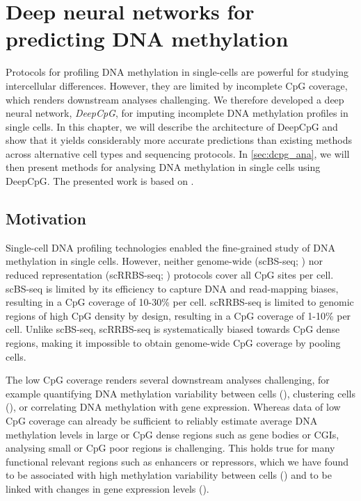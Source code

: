\chapter{Deep neural networks for predicting DNA methylation} \label{sec:dcpg}

\ifpdf
    \graphicspath{{Chapter4/Figs/Raster/}{Chapter4/Figs/PDF/}{Chapter4/Figs/}}
\else
    \graphicspath{{Chapter4/Figs/Vector/}{Chapter4/Figs/}}
\fi

Protocols for profiling DNA methylation in single-cells are powerful for studying intercellular differences. However, they are limited by incomplete CpG coverage, which renders downstream analyses challenging. We therefore developed a deep neural network, \emph{DeepCpG}, for imputing incomplete DNA methylation profiles in single cells. In this chapter, we will describe the architecture of DeepCpG and show that it yields considerably more accurate predictions than existing methods across alternative cell types and sequencing protocols. In \cref{sec:dcpg_ana}, we will then present methods for analysing DNA methylation in single cells using DeepCpG. The presented work is based on \citet{angermueller_accurate_2017}.


\section{Motivation}

Single-cell DNA profiling technologies enabled the fine-grained study of DNA methylation in single cells. However, neither genome-wide (scBS-seq; ) nor reduced representation (scRRBS-seq; ) protocols cover all CpG sites per cell. scBS-seq is limited by its efficiency to capture DNA and read-mapping biases, resulting in a CpG coverage of 10-30\% per cell. scRRBS-seq is limited to genomic regions of high CpG density by design, resulting in a CpG coverage of 1-10\% per cell. Unlike scBS-seq, scRRBS-seq is systematically biased towards CpG dense regions, making it impossible to obtain genome-wide CpG coverage by pooling cells.

The low CpG coverage renders several downstream analyses challenging, for example quantifying DNA methylation variability between cells (), clustering cells (), or correlating DNA methylation with gene expression. Whereas data of low CpG coverage can already be sufficient to reliably estimate average DNA methylation levels in large or CpG dense regions such as gene bodies or CGIs, analysing small or CpG poor regions is challenging. This holds true for many functional relevant regions such as enhancers or repressors, which we have found to be associated with high methylation variability between cells () and to be linked with changes in gene expression levels ().

